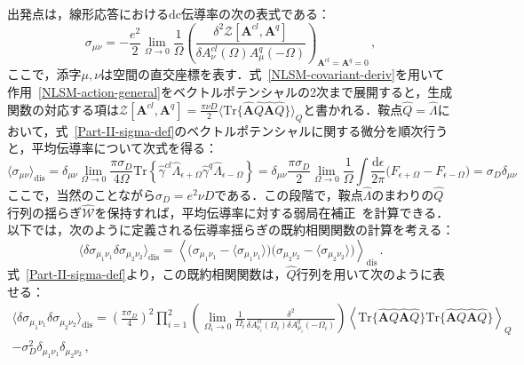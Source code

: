 \documentclass[a4paper,11pt]{ltjsarticle}
\def\Tr{\mathrm{Tr}}
\def\d{\mathrm{d}}
\begin{document}
出発点は，線形応答における$\mathrm{dc}$伝導率の次の表式である：
\begin{equation}\label{Part-II-sigma-def}
\sigma_{\mu\nu}=-\frac{e^2}{2}\lim_{\Omega\to 0}\frac{1}{\Omega}
\left(\frac{\delta^{2}\mathcal{Z}[\mathbf{A}^{cl},\mathbf{A}^{q}]}
{\delta
A^{cl}_{\nu}(\Omega)A^{q}_{\mu}(-\Omega)}\right)_{\mathbf{A}^{cl}=\mathbf{A}^{q}=0}\,,
\end{equation}
ここで，添字$\mu,\nu$は空間の直交座標を表す．式~\eqref{NLSM-covariant-deriv}を用いて作用~\eqref{NLSM-action-general}をベクトルポテンシャルの2次まで展開すると，生成関数の対応する項は$\mathcal{Z}[\mathbf{A}^{cl},\mathbf{A}^{q}]=\frac{\pi\nu
D}{2}\big\langle\Tr\big\{\hat{\mathbf{A}}
\hat{Q}\hat{\mathbf{A}}\hat{Q}\big\}\big\rangle_{Q}$と書かれる．鞍点$\hat{Q}=\hat{\Lambda}$において，式~\eqref{Part-II-sigma-def}のベクトルポテンシャルに関する微分を順次行うと，平均伝導率について次式を得る：
\begin{equation}\label{NLSM-sigma-Drude}
\langle\sigma_{\mu\nu}\rangle_{\mathrm{dis}}=
\delta_{\mu\nu}\lim_{\Omega\to 0}\frac{\pi\sigma_{D}}{4\Omega}
\Tr\left\{\hat{\gamma}^{cl}\hat{\Lambda}_{\epsilon+\Omega}
\hat{\gamma}^{q}\hat{\Lambda}_{\epsilon-\Omega}\right\}=
\delta_{\mu\nu}\frac{\pi\sigma_{D}}{2}\lim_{\Omega\to0}
\frac{1}{\Omega}\int\frac{\d\epsilon}{2\pi}
\big(F_{\epsilon+\Omega}-F_{\epsilon-\Omega}\big)=\sigma_{D}\delta_{\mu\nu}
\end{equation}
ここで，当然のことながら$\sigma_D=e^2\nu D$である．この段階で，鞍点$\hat{\Lambda}$のまわりの$\hat Q$行列の揺らぎ$\hat{\mathcal{W}}$を保持すれば，平均伝導率に対する弱局在補正~\cite{Hikami,Gor'kovLarkinKhmelnitskii,AAKL,LeeRamakrishnan,ALW-book}を計算できる．以下では，次のように定義される伝導率揺らぎの既約相関関数の計算を考える：
$$\langle\delta\sigma_{\mu_{1}\nu_{1}}
\delta\sigma_{\mu_{2}\nu_{2}}\rangle_{\mathrm{dis}}=
\left\langle\big(\sigma_{\mu_{1}\nu_{1}}-\langle\sigma_{\mu_{1}\nu_{1}}\rangle\big)
\big(\sigma_{\mu_{2}\nu_{2}}-
\langle\sigma_{\mu_{2}\nu_{2}}\rangle\big)\right\rangle_{\mathrm{dis}}\,.$$
式~\eqref{Part-II-sigma-def}より，この既約相関関数は，$\hat Q$行列を用いて次のように表せる：
\begin{eqnarray}\label{Part-II-UCF-def}
\langle\delta\sigma_{\mu_{1}\nu_{1}}
\delta\sigma_{\mu_{2}\nu_{2}}\rangle_{\mathrm{dis}}=
\left(\frac{\pi\sigma_{D}}{4}\right)^{2}
\prod^{2}_{i=1}\left(\lim_{\Omega_{i}\to 0}
\frac{1}{\Omega_{i}}\frac{\delta^{2}}{\delta
A^{cl}_{\nu_{i}}(\Omega_{i})\delta
A^{q}_{\mu_{i}}(-\Omega_{i})}\right)
\left\langle\Tr\{\hat{\mathbf{A}}\hat{Q}\hat{\mathbf{A}}\hat{Q}\}
\Tr\{\hat{\mathbf{A}}\hat{Q}\hat{\mathbf{A}}\hat{Q}\}\right\rangle_{Q}\nonumber\\
-\sigma^{2}_{D} \delta_{\mu_{1}\nu_{1}}\delta_{\mu_{2}\nu_{2}}\,,
\end{eqnarray}
\end{document}
